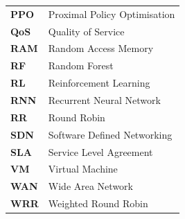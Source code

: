 \begin{tabular}{ll}
\textbf{PPO}      & Proximal Policy Optimisation \\
\textbf{QoS}      & Quality of Service \\
\textbf{RAM}      & Random Access Memory \\
\textbf{RF}       & Random Forest \\
\textbf{RL}       & Reinforcement Learning \\
\textbf{RNN}      & Recurrent Neural Network \\
\textbf{RR}       & Round Robin \\
\textbf{SDN}      & Software Defined Networking \\
\textbf{SLA}      & Service Level Agreement \\
\textbf{VM}       & Virtual Machine \\
\textbf{WAN}      & Wide Area Network \\
\textbf{WRR}      & Weighted Round Robin \\
\end{tabular}
